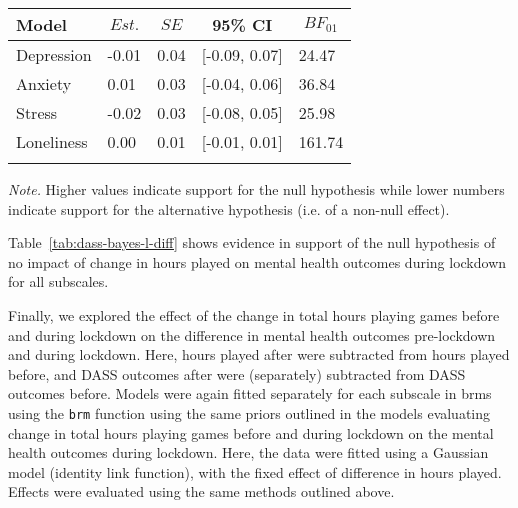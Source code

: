 \documentclass[
  english,
  jou,floatsintext]{apa6}
\begin{document}
\begin{table*}[tbp]

\begin{center}
\begin{threeparttable}

\caption{\label{tab:dass-bayes-l-diff}Bayes factors for the depression, anxiety, stress, and loneliness models evaluating evidence in support of the point null hypothesis that the difference in hours played has no impact on mental health outcomes during lockdown.}

\begin{tabular}{lllll}
\toprule
Model & \multicolumn{1}{c}{$Est.$} & \multicolumn{1}{c}{$SE$} & \multicolumn{1}{c}{95\% CI} & \multicolumn{1}{c}{$BF_{01}$}\\
\midrule
Depression & -0.01 & 0.04 & [-0.09, 0.07] & 24.47\\
Anxiety & 0.01 & 0.03 & [-0.04, 0.06] & 36.84\\
Stress & -0.02 & 0.03 & [-0.08, 0.05] & 25.98\\
Loneliness & 0.00 & 0.01 & [-0.01, 0.01] & 161.74\\
\bottomrule
\addlinespace
\end{tabular}

\begin{tablenotes}[para]
\normalsize{\textit{Note.} Higher values indicate support for the null hypothesis while lower numbers indicate support for the alternative hypothesis (i.e. of a non-null effect).}
\end{tablenotes}

\end{threeparttable}
\end{center}

\end{table*}

Table~\ref{tab:dass-bayes-l-diff} shows evidence in support of the null hypothesis of no impact of change in hours played on mental health outcomes during lockdown for all subscales.

Finally, we explored the effect of the change in total hours playing games before and during lockdown on the difference in mental health outcomes pre-lockdown and during lockdown. Here, hours played after were subtracted from hours played before, and DASS outcomes after were (separately) subtracted from DASS outcomes before. Models were again fitted separately for each subscale in brms using the \texttt{brm} function using the same priors outlined in the models evaluating change in total hours playing games before and during lockdown on the mental health outcomes during lockdown. Here, the data were fitted using a Gaussian model (identity link function), with the fixed effect of difference in hours played. Effects were evaluated using the same methods outlined above.
\end{document}

